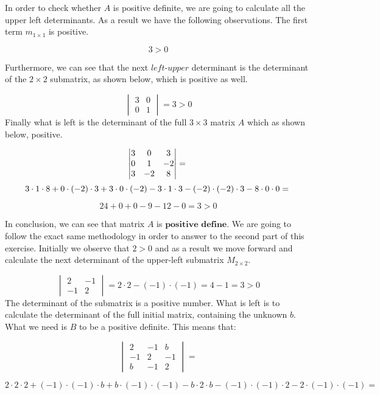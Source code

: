 \documentclass[
]{article}
\begin{document}
In order to check whether \(A\) is positive definite, we are going to
calculate all the upper left determinants. As a result we have the
following observations. The first term \(m_{1\times 1}\) is positive.

\[
3 > 0
\]

Furthermore, we can see that the next \(\textit{left-upper}\)
determinant is the determinant of the \(2\times 2\) submatrix, as shown
below, which is positive as well.

\[
\begin{vmatrix}
3 & 0 \\
0 & 1
\end{vmatrix} = 3 > 0
\] Finally what is left is the determinant of the full \(3\times 3\)
matrix \(A\) which as shown below, positive.

\[
\begin{vmatrix}
3   &  0    &  3    \\
0   &  1    & -2    \\
3   & -2    &  8    
\end{vmatrix} = \\
\] \[
3\cdot1\cdot8+0\cdot(-2)\cdot3+3\cdot0\cdot(-2)-3\cdot1\cdot3-(-2)\cdot(-2)\cdot3-8\cdot0\cdot0=\\
\]

\[
24+0+0-9-12-0=3>0
\]

In conclusion, we can see that matrix \(A\) is
\(\textbf{positive define}\). We are going to follow the exact same
methodology in order to answer to the second part of this exercise.
Initially we observe that \(2>0\) and as a result we move forward and
calculate the next determinant of the upper-left submatrix
\(M_{2\times2}\).

\[
\begin{vmatrix}
 2 &  -1 \\
-1 & 2 
\end{vmatrix} = 2\cdot 2 - (-1)\cdot (-1)= 4 - 1 = 3 >0
\] The determinant of the submatrix is a positive number. What is left
is to calculate the determinant of the full initial matrix, containing
the unknown \(b\). What we need is \(B\) to be a positive definite. This
means that:

\[
\begin{vmatrix}
 2  & -1  &  b   \\
-1  &  2  & -1   \\
 b  & -1  &  2  
\end{vmatrix}=
\]

\[
2\cdot 2\cdot 2 + (-1)\cdot (-1)\cdot b + b\cdot (-1)\cdot (-1) - b \cdot 2\cdot b- (-1)\cdot (-1)\cdot 2 - 2 \cdot (-1)\cdot (-1)=
\]
\end{document}
